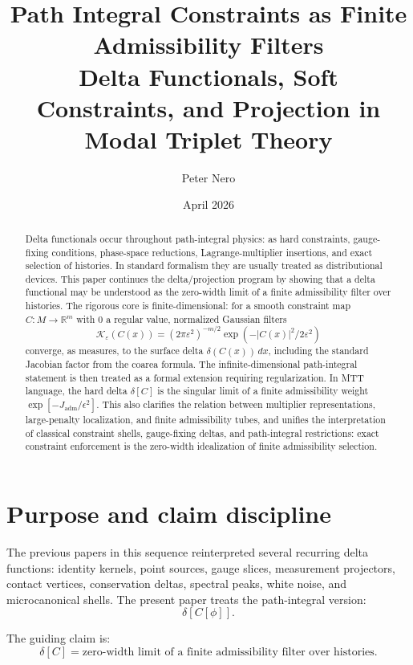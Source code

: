 \documentclass[11pt]{article}
\title{Path Integral Constraints as Finite Admissibility Filters\\
\large Delta Functionals, Soft Constraints, and Projection in Modal Triplet Theory}
\author{Peter Nero}
\date{April 2026}
\begin{document}
\maketitle

\begin{abstract}
Delta functionals occur throughout path-integral physics: as hard constraints, gauge-fixing conditions,
phase-space reductions, Lagrange-multiplier insertions, and exact selection of histories.  In standard
formalism they are usually treated as distributional devices.  This paper continues the delta/projection
program by showing that a delta functional may be understood as the zero-width limit of a finite
admissibility filter over histories.  The rigorous core is finite-dimensional: for a smooth constraint map
\(C:M\to\mathbb R^m\) with \(0\) a regular value, normalized Gaussian filters
\[
\mathcal K_\varepsilon(C(x))=(2\pi\varepsilon^2)^{-m/2}\exp(-|C(x)|^2/2\varepsilon^2)
\]
converge, as measures, to the surface delta \(\delta(C(x))\,dx\), including the standard Jacobian factor
from the coarea formula.  The infinite-dimensional path-integral statement is then treated as a formal
extension requiring regularization.  In MTT language, the hard delta \(\delta[C]\) is the singular
limit of a finite admissibility weight \(\exp[-J_{\mathrm{adm}}/\epsilon^2]\).  This also clarifies the relation between multiplier representations, large-penalty localization, and finite admissibility tubes, and unifies the
interpretation of classical constraint shells, gauge-fixing deltas, and path-integral restrictions:
exact constraint enforcement is the zero-width idealization of finite admissibility selection.
\end{abstract}

\tableofcontents

\section{Purpose and claim discipline}

The previous papers in this sequence reinterpreted several recurring delta functions:
identity kernels, point sources, gauge slices, measurement projectors, contact vertices,
conservation deltas, spectral peaks, white noise, and microcanonical shells.
The present paper treats the path-integral version:
\[
\delta[C[\phi]] .
\]

The guiding claim is:
\[
\boxed{\delta[C]=\text{zero-width limit of a finite admissibility filter over histories}.}
\]
\end{document}
